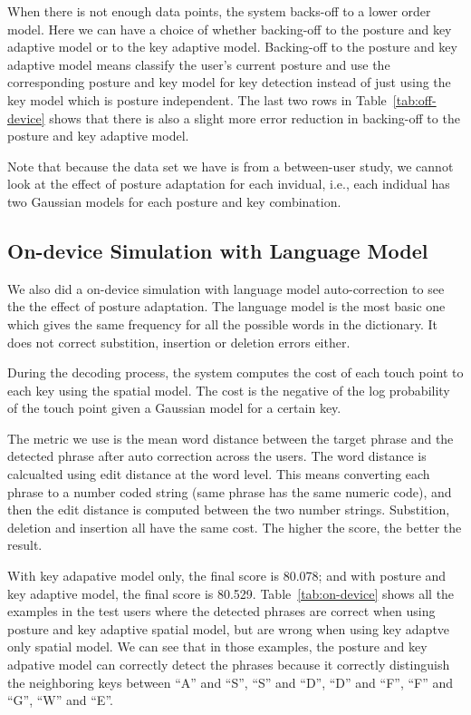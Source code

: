 \documentclass{sigchi}
\begin{document}
When there is not enough data points, the system backs-off to a lower order model.
Here we can have a choice of whether backing-off to the posture and key adaptive model or 
to the key adaptive model. Backing-off to the posture and key adaptive model means
classify the user's current posture and use the corresponding posture and key model for key detection instead
of just using the key model which is posture independent. The last two rows in 
Table~\ref{tab:off-device} shows that there is also a slight more error reduction  in backing-off to
the posture and key adaptive model.

Note that because the data set we have is from a between-user study, we cannot look
at the effect of posture adaptation for each invidual, i.e., each indidual has two Gaussian models
for each posture and key combination.

\subsection{On-device Simulation with Language Model}
We also did a on-device simulation with language model auto-correction to see the
the effect of posture adaptation. The language model is the most basic one which
gives the same frequency for all the possible words in the dictionary. It does not
correct substition, insertion or deletion errors either.

During the decoding process, the system computes the cost of each touch point to
each key using the spatial model. The cost is the negative of the log probability of
the touch point given a Gaussian model for a certain key.

The metric we use is the mean word distance between the target phrase and the detected
phrase after auto correction across the users. The word distance is calcualted using 
edit distance at the word level. This means converting each phrase to a number coded
string (same phrase has the same numeric code), and then the edit distance is computed
between the two number strings. Substition, deletion and insertion all have the same
cost. The higher the score, the better the result.

With key adapative model only, the final score is 80.078; and with posture and key
adaptive model, the final score is 80.529. Table~\ref{tab:on-device} shows all the examples
in the test users where the detected phrases are correct when using posture and key adaptive spatial model, but
are wrong when using key adaptve only spatial model. We can see that in those examples,
the posture and key adpative model can correctly detect the phrases because it
correctly distinguish the neighboring keys between ``A'' and ``S'', ``S'' and ``D'',
``D'' and ``F'', ``F'' and ``G'', ``W'' and ``E''. 
\end{document}
